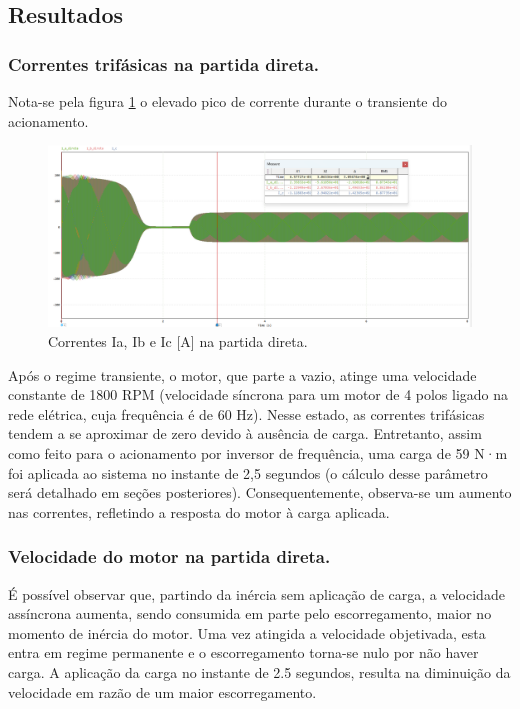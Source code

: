 \documentclass[a4paper, 11pt]{article}
\begin{document}
\subsection{Resultados}

\subsubsection{Correntes trifásicas na partida direta.}

Nota-se pela figura \ref{correntes diretas} o elevado pico de corrente durante o transiente do acionamento.

\begin{figure}[H]
    \centering
    \includegraphics[width=1\linewidth]{images/correntes_diretas_novo.png}
    \caption{Correntes Ia, Ib e Ic [A] na partida direta.}
    \label{correntes diretas}
\end{figure}

Após o regime transiente, o motor, que parte a vazio, atinge uma velocidade constante de 1800 RPM (velocidade síncrona para um motor de 4 polos ligado na rede elétrica, cuja frequência é de 60 Hz). Nesse estado, as correntes trifásicas tendem a se aproximar de zero devido à ausência de carga. Entretanto, assim como feito para o acionamento por inversor de frequência, uma carga de 59 N·m foi aplicada ao sistema no instante de 2,5 segundos (o cálculo desse parâmetro será detalhado em seções posteriores). Consequentemente, observa-se um aumento nas correntes, refletindo a resposta do motor à carga aplicada.

\subsubsection{Velocidade do motor na partida direta.}
É possível observar que, partindo da inércia sem aplicação de carga, a velocidade assíncrona aumenta, sendo consumida em parte pelo escorregamento, maior no momento de inércia do motor. Uma vez atingida a velocidade objetivada, esta entra em regime permanente e o escorregamento torna-se nulo por não haver carga. A aplicação da carga no instante de 2.5 segundos, resulta na diminuição da velocidade em razão de um maior escorregamento.  
\end{document}
